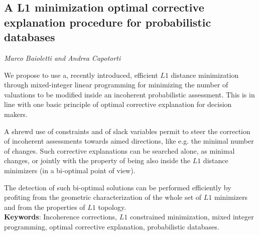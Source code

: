 \documentclass[../booklet.tex]{subfiles}
\begin{document}
\subsection[A  L1 minimization optimal corrective explanation procedure for probabilistic databases. {\it Marco Baioletti and Andrea Capotorti}]{A  L1 minimization optimal corrective explanation procedure for probabilistic databases}
 

\begin{center}
  {\it Marco Baioletti and Andrea Capotorti}
\end{center}

\vskip 0.8cm


We propose to use a, recently introduced,  efficient $L1$ distance minimization through mixed-integer
linear programming for minimizing the number of valuations to be modified inside an incoherent probabilistic assessment. This is in line with one basic principle of optimal corrective explanation for decision makers.

 A shrewd use of constraints and of slack variables permit to steer the correction of incoherent assessments towards aimed directions, like e.g. the minimal number of changes. Such corrective explanations can be searched alone, as minimal changes, or jointly with the property of being also inside the $L1$ distance minimizers (in a bi-optimal point of view).
 
 The detection of such bi-optimal solutions can be performed efficiently by profiting from the geometric characterization of the whole set of $L1$ minimizers and from the properties of $L1$ topology.
 \\
\textbf{Keywords}: Incoherence corrections, $L1$ constrained minimization, mixed integer programming, optimal corrective explanation, probabilistic databases.
\end{document}
